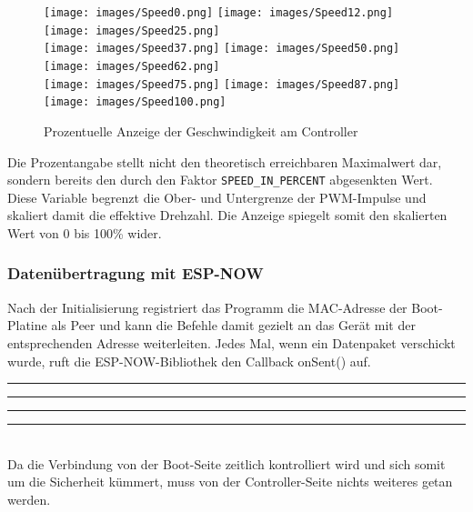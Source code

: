 \documentclass[a4paper,12pt]{article}
\begin{document}
\begin{figure}[htp]
\centering
\makebox[1em][l]{}%
\texttt{[image: images/Speed0.png]}\hspace{1pt}%
\texttt{[image: images/Speed12.png]}\hspace{1pt}%
\texttt{[image: images/Speed25.png]}\\
\makebox[1em][l]{}%
\texttt{[image: images/Speed37.png]}\hspace{1pt}%
\texttt{[image: images/Speed50.png]}\hspace{1pt}%
\texttt{[image: images/Speed62.png]}\\
\makebox[1em][l]{}%
\texttt{[image: images/Speed75.png]}\hspace{1pt}%
\texttt{[image: images/Speed87.png]}\hspace{1pt}%
\texttt{[image: images/Speed100.png]}
\caption{Prozentuelle Anzeige der Geschwindigkeit am Controller\label{SpeedDisplay}}
\end{figure}

Die Prozentangabe stellt nicht den theoretisch erreichbaren Maximalwert dar, sondern bereits den durch den Faktor \texttt{SPEED\_IN\_PERCENT} abgesenkten Wert. Diese Variable begrenzt die Ober- und Untergrenze der PWM-Impulse und skaliert damit die effektive Drehzahl. Die Anzeige spiegelt somit den skalierten Wert von 0 bis 100\% wider.

\subsubsection{Datenübertragung mit ESP-NOW}
Nach der Initialisierung registriert das Programm die MAC-Adresse der Boot-Platine als Peer und kann die Befehle damit gezielt an das Gerät mit der entsprechenden Adresse weiterleiten. Jedes Mal, wenn ein Datenpaket verschickt wurde, ruft die ESP-NOW-Bibliothek den Callback onSent() auf.
\newline\noindent\rule{\linewidth}{0.4pt}  %

\noindent\rule{\linewidth}{0.4pt}  %
\newpage
\noindent\rule{\linewidth}{0.4pt}  %

\noindent\rule{\linewidth}{0.4pt}\\[0.5em]  %
Da die Verbindung von der Boot-Seite zeitlich kontrolliert wird und sich somit um die Sicherheit kümmert, muss von der Controller-Seite nichts weiteres getan werden.
\end{document}
